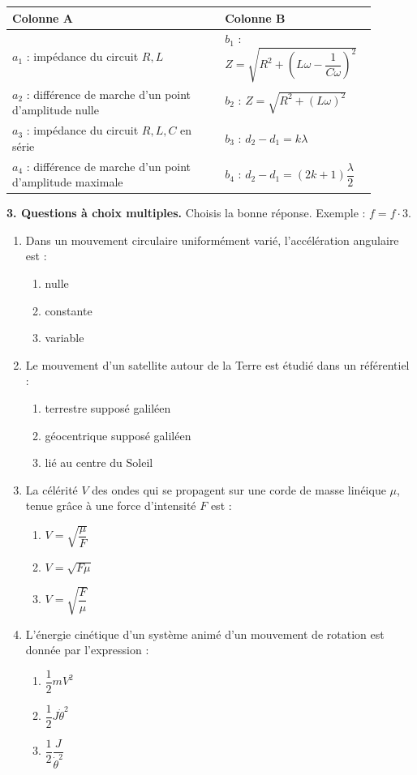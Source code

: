\documentclass[11pt]{article}
\begin{document}
\begin{center}\renewcommand{\arraystretch}{1.8}
\begin{tabular}{|p{0.55\linewidth}|p{0.34\linewidth}|}
\hline
\textbf{Colonne A} & \textbf{Colonne B} \\
\hline
$a_1$ : impédance du circuit $R, L$ & $b_1$ : $Z = \sqrt{R^2 + \left(L\omega - \dfrac{1}{C\omega}\right)^2}$ \\
\hline
$a_2$ : différence de marche d'un point d'amplitude nulle & $b_2$ : $Z = \sqrt{R^2 + (L\omega)^2}$ \\
\hline
$a_3$ : impédance du circuit $R, L, C$ en série & $b_3$ : $d_2 - d_1 = k\lambda$ \\
\hline
$a_4$ : différence de marche d'un point d'amplitude maximale & $b_4$ : $d_2 - d_1 = (2k + 1)\dfrac{\lambda}{2}$ \\
\hline
\end{tabular}
\end{center}

\noindent\textbf{3. Questions à choix multiples.} Choisis la bonne réponse. Exemple : $f = f\cdot3$.
\begin{enumerate}[label=\alph*.]
  \item Dans un mouvement circulaire uniformément varié, l'accélération angulaire est :
  \begin{enumerate}[label=a\textsubscript{\arabic*})]
    \item nulle
    \item constante
    \item variable
  \end{enumerate}
  \item Le mouvement d'un satellite autour de la Terre est étudié dans un référentiel :
  \begin{enumerate}[label=b\textsubscript{\arabic*})]
    \item terrestre supposé galiléen
    \item géocentrique supposé galiléen
    \item lié au centre du Soleil
  \end{enumerate}
  \item La célérité $V$ des ondes qui se propagent sur une corde de masse linéique $\mu$, tenue grâce à une force d'intensité $F$ est :
  \begin{enumerate}[label=c\textsubscript{\arabic*})]
    \item $V = \sqrt{\dfrac{\mu}{F}}$
    \item $V = \sqrt{F\mu}$
    \item $V = \sqrt{\dfrac{F}{\mu}}$
  \end{enumerate}
  \item L'énergie cinétique d'un système animé d'un mouvement de rotation est donnée par l'expression :
  \begin{enumerate}[label=d\textsubscript{\arabic*})]
    \item $\dfrac{1}{2}mV^2$
    \item $\dfrac{1}{2}J\dot{\theta}^2$
    \item $\dfrac{1}{2}\dfrac{J}{\dot{\theta}^2}$
  \end{enumerate}
\end{enumerate}
\end{document}
